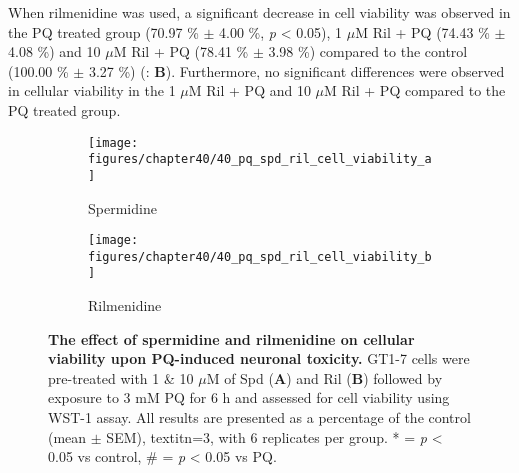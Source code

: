 When rilmenidine was used, a significant decrease in cell viability was observed in the PQ treated group (70.97 \% $\pm$ 4.00 \%, \textit{p} < 0.05), 1 $\mu$M Ril + PQ (74.43 \% $\pm$ 4.08 \%) and 10 $\mu$M Ril + PQ (78.41 \% $\pm$ 3.98 \%) compared to the control (100.00 \% $\pm$ 3.27 \%) (: \textbf{B}). Furthermore, no significant differences were observed in cellular viability in the 1 $\mu$M Ril + PQ and 10 $\mu$M Ril + PQ compared to the PQ treated group.

\begin{figure}[!htbp]
  \center
  \begin{subfigure}[b]{0.495\linewidth}
    \texttt{[image: figures/chapter40/40\_pq\_spd\_ril\_cell\_viability\_a]}
    \caption{Spermidine}
  \end{subfigure}
  \begin{subfigure}[b]{0.495\linewidth}
    \texttt{[image: figures/chapter40/40\_pq\_spd\_ril\_cell\_viability\_b]}
    \caption{Rilmenidine}
  \end{subfigure}
  \caption[The effect of spermidine and rilmenidine on cellular viability upon PQ-induced neuronal toxicity]{\textbf{The effect of spermidine and rilmenidine on cellular viability upon PQ-induced neuronal toxicity.} GT1-7 cells were pre-treated with 1 \& 10 $\mu$M of Spd (\textbf{A}) and Ril (\textbf{B}) followed by exposure to 3 mM PQ for 6 h and assessed for cell viability using WST-1 assay. All results are presented as a percentage of the control (mean $\pm$ SEM), textit{n}=3, with 6 replicates per group. * = \textit{p} < 0.05 vs control, \# = \textit{p} < 0.05 vs PQ.}
  \label{fig:40_pq_spd_ril_cell_viability_a}
\end{figure}

